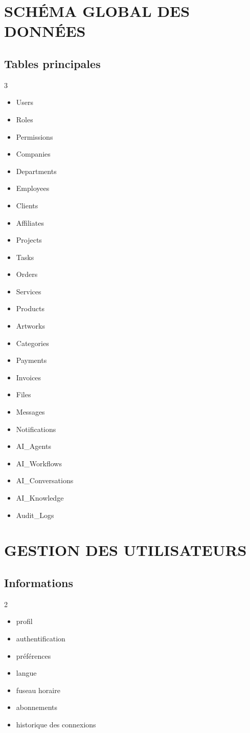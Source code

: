 \documentclass[12pt,a4paper,oneside]{book}
\begin{document}
\chapter{SCHÉMA GLOBAL DES DONNÉES}

\section{Tables principales}
\begin{multicols}{3}
\begin{itemize}
\item Users
\item Roles
\item Permissions
\item Companies
\item Departments
\item Employees
\item Clients
\item Affiliates
\item Projects
\item Tasks
\item Orders
\item Services
\item Products
\item Artworks
\item Categories
\item Payments
\item Invoices
\item Files
\item Messages
\item Notifications
\item AI\_Agents
\item AI\_Workflows
\item AI\_Conversations
\item AI\_Knowledge
\item Audit\_Logs
\end{itemize}
\end{multicols}

\chapter{GESTION DES UTILISATEURS}

\section{Informations}
\begin{multicols}{2}
\begin{itemize}
\item profil
\item authentification
\item préférences
\item langue
\item fuseau horaire
\item abonnements
\item historique des connexions
\end{itemize}
\end{multicols}
\end{document}
